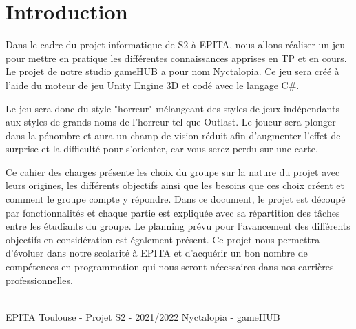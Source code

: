 \section{Introduction}
\setlength{\parindent}{5ex}
Dans le cadre du projet informatique de S2 à EPITA, nous allons réaliser un jeu pour mettre en pratique les différentes connaissances apprises en TP et en cours.
Le projet de notre studio gameHUB a pour nom Nyctalopia. Ce jeu sera créé à l’aide du moteur de jeu Unity Engine 3D et codé avec le langage C\#.

\setlength{\parindent}{5ex}
Le jeu sera donc du style "horreur" mélangeant des styles de jeux indépendants aux styles de grands noms de l'horreur tel que Outlast.
Le joueur sera plonger dans la pénombre et aura un champ de vision réduit afin d'augmenter l'effet de surprise et la difficulté pour s'orienter, car vous serez perdu sur une carte.

\setlength{\parindent}{5ex}
Ce cahier des charges présente les choix du groupe sur la nature du projet
avec leurs origines, les différents objectifs ainsi que les besoins que ces choix
créent et comment le groupe compte y répondre. Dans ce document, le projet
est découpé par fonctionnalités et chaque partie est expliquée avec sa répartition
des tâches entre les étudiants du groupe. Le planning prévu pour l’avancement
des différents objectifs en considération est également présent.
Ce projet nous permettra d’évoluer dans notre scolarité à EPITA et d’acquérir
un bon nombre de compétences en programmation qui nous seront nécessaires
dans nos carrières professionnelles.

\vfill
\noindent\makebox[\linewidth]{\rule{.8\paperwidth}{.6pt}}\\[0.2cm]
EPITA Toulouse - Projet S2 - 2021/2022 \hfill Nyctalopia - gameHUB
\noindent\makebox[\linewidth]{\rule{.8\paperwidth}{.6pt}}

\newpage